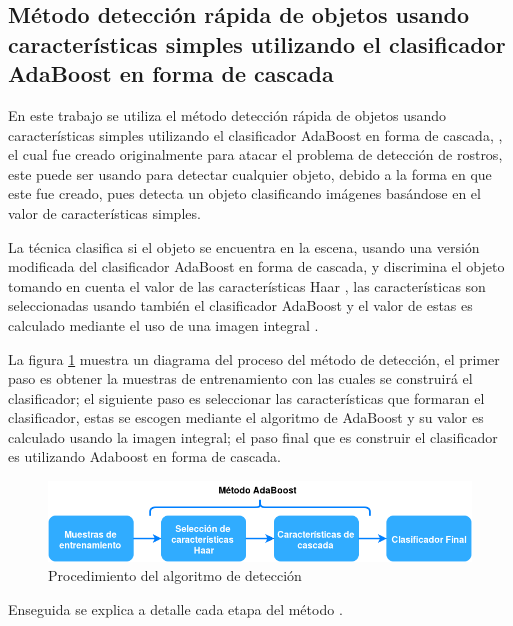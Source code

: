 \subsection{Método detección rápida de objetos usando características simples utilizando el clasificador AdaBoost en forma de cascada}\label{subsec:ViolaJones}

En este trabajo se utiliza el método detección rápida de objetos usando características simples utilizando el clasificador AdaBoost en forma de cascada, \citep{Viola2001}, el cual fue creado originalmente para atacar el problema de detección de rostros, este puede ser usando para detectar cualquier objeto, debido a la forma en que este fue creado, pues detecta un objeto clasificando imágenes basándose en el valor de características simples.

La técnica clasifica si el objeto se encuentra en la escena, usando una versión modificada del clasificador AdaBoost \citep{Freund1995} en forma de cascada, y discrimina el objeto tomando en cuenta el valor de las características Haar \citep{Viola2001}, las características son seleccionadas usando también el clasificador AdaBoost y el valor de estas es calculado mediante el uso de una imagen integral \citep{Viola2001}. 

La figura \ref{fig:ViolaJonesDiagram} muestra un diagrama del proceso del método de detección, el primer paso es obtener la muestras de entrenamiento con las cuales se construirá el clasificador; el siguiente paso es seleccionar las características que formaran el clasificador, estas se escogen mediante el algoritmo de AdaBoost y su valor es calculado usando la imagen integral; el paso final que es construir el clasificador es utilizando 
Adaboost en forma de cascada.

\begin{figure}[h!]
\begin{center}
\includegraphics[scale=.6]{./Figures/ViolaJonesDiagram.png}
\end{center}
\caption{Procedimiento del algoritmo de detección}
\label{fig:ViolaJonesDiagram}
\end{figure}

Enseguida se explica a detalle cada etapa del método \citep{Viola2001}. 

